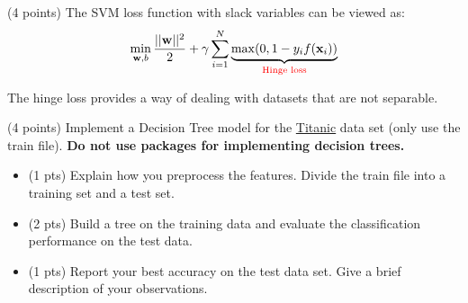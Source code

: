 \documentclass{exam}
\newcommand{\xx}{{\bf{x}}}
\newcommand{\ww}{{\bf{w}}}
\begin{document}
\begin{questions}
\newpage
{}\label{q1} (4 points) The SVM loss function with slack variables can be viewed as:
	\begin{align}
		      \min_{\mathbf{w},b} \frac{ ||\mathbf{w}||^2}{2} + \gamma \sum_{i=1}^N \underbrace{\max(0, 1- y_i f(\xx_i))}_{\textcolor{red}{\text{Hinge loss}}}
		\end{align}

The hinge loss provides a way of dealing with datasets that are not separable.


\newpage
{} (4 points) Implement a Decision Tree model for the \href{https://www.kaggle.com/c/titanic/data}{Titanic} data set (only use the train file). \textbf{Do not use packages for implementing decision trees.}
\begin{itemize}
\item (1 pts) Explain how you preprocess the features. Divide the train file into a training set and a test set.
\item (2 pts) Build a tree on the training data and evaluate the classification performance on the test data.
\item (1 pts) Report your best accuracy on the test data set. Give a brief description of your observations.
\end{itemize}


\end{questions}
\end{document}

